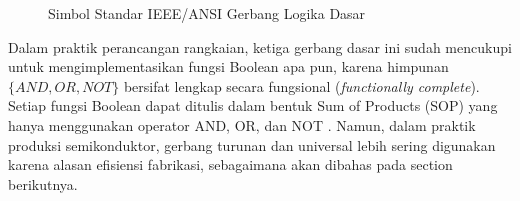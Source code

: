\begin{figure}[H]
\centering
{}
\caption{Simbol Standar IEEE/ANSI Gerbang Logika Dasar}
\label{fig:gerbang-dasar-11}
\end{figure}

Dalam praktik perancangan rangkaian, ketiga gerbang dasar ini sudah mencukupi untuk mengimplementasikan fungsi Boolean apa pun, karena himpunan $\{AND, OR, NOT\}$ bersifat lengkap secara fungsional (\textit{functionally complete}). Setiap fungsi Boolean dapat ditulis dalam bentuk Sum of Products (SOP) yang hanya menggunakan operator AND, OR, dan NOT \cite{rosen2019}. Namun, dalam praktik produksi semikonduktor, gerbang turunan dan universal lebih sering digunakan karena alasan efisiensi fabrikasi, sebagaimana akan dibahas pada section berikutnya.
